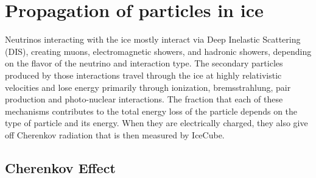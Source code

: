 \section{Propagation of particles in ice}
\label{sec:particle-interactions}
Neutrinos interacting with the ice mostly interact via Deep Inelastic Scattering (DIS), creating muons, electromagnetic showers, and hadronic showers, depending on the flavor of the neutrino and interaction type.
The secondary particles produced by those interactions travel through the ice at highly relativistic velocities and lose energy primarily through ionization, bremsstrahlung, pair production and photo-nuclear interactions.
The fraction that each of these mechanisms contributes to the total energy loss of the particle depends on the type of particle and its energy.
When they are electrically charged, they also give off Cherenkov radiation that is then measured by IceCube.

\subsection{Cherenkov Effect}

